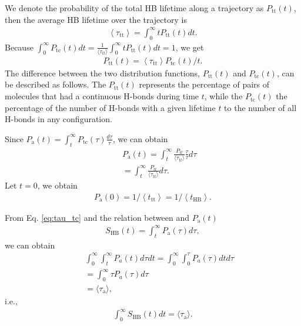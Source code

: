 We denote the probability of the total HB lifetime along a trajectory as $P_{\mathrm{tt}}(t)$,
then the average HB lifetime over the trajectory is
\begin{eqnarray}
\left\langle\tau_{\mathrm{tt}}\right\rangle=\int_{0}^{\infty} t P_{\mathrm{tt}}(t) d t.
\label{eq:relation_tau_tt}
\end{eqnarray}
Because $\int_{0}^{\infty} P_{\mathrm{tc}}(t) d t=\frac{1}{\langle \tau_{tt}\rangle} \int_{0}^{\infty} t P_{\mathrm{tt}}(t) d t = 1$, 
we get 
\begin{eqnarray}
P_{\mathrm{tt}}(t)=\left\langle \tau_{\mathrm{tt}}\right\rangle P_{\mathrm{tc}}(t) / t.
\label{eq:relation_P_tt--P_tc}
\end{eqnarray}
The difference between the two distribution functions, $P_{\mathrm{tt}}(t)$ and $P_{\mathrm{tc}}(t)$, can be described as follows.
The $P_{\mathrm{tt}}(t)$ represents the percentage of pairs of molecules that had a continuous H-bonds during time $t$, 
while the $P_{\mathrm{tc}}(t)$ the percentage of the number of H-bonds with a given lifetime $t$ to the number of all H-bonds in any configuration. 
\cite{Voloshin2009}

Since $P_{\mathrm{a}}(t)=\int_{t}^{\infty} P_{\mathrm{tc}}(\tau) \frac{d \tau}{\tau}$,
we can obtain
\begin{eqnarray}
&& P_{\mathrm{a}}(t)=\int_t^\infty \frac{P_{tt}}{\langle\tau_{tt}\rangle} \frac{\tau}{\tau} d\tau \nonumber \\
&& =  \int_t^\infty \frac{P_{tt}}{\langle\tau_{tt}\rangle}d\tau. \nonumber
\label{eq:P_a}
\end{eqnarray}
Let $t=0$, we obtain
\begin{eqnarray}
P_{\mathrm{a}}(0)=1 /\left\langle t_{\mathrm{tt}}\right\rangle = 1 /\left\langle t_{\mathrm{HB}}\right\rangle.
\label{eq:P_a0}
\end{eqnarray}

From Eq. \ref{eq:tau_tc} and the relation between \SHB and $P_{\mathrm{a}}(t)$
\begin{eqnarray}
S_{\mathrm{HB}}(t)=\int_{t}^{\infty} P_{\mathrm{a}}(\tau) d \tau,
\label{eq:P_a}
\end{eqnarray}
we can obtain
%
\begin{eqnarray}
&&\int_{0}^{\infty} \int_{t}^{\infty} P_{a}(t) d \tau d t = \int_{0}^{\infty} \int_{0}^{\tau} P_{a}(\tau) d t d \tau \nonumber \\
&& = \int_{0}^{\infty} \tau P_{a}(\tau) d \tau \nonumber \\
&& = \langle \tau_{\mathrm{a}} \rangle, \nonumber
\end{eqnarray}
i.e., 
\begin{eqnarray}
\int_{0}^{\infty}  S_{\mathrm{HB}}(t) d t = \langle \tau_{\mathrm{a}} \rangle.
\label{eq:int_Ca}
\end{eqnarray}
